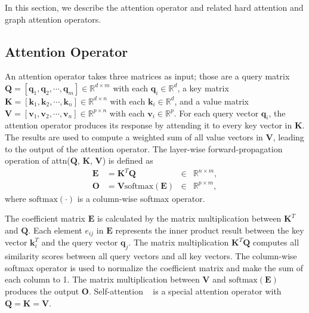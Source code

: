 \documentclass[sigconf]{acmart}
\begin{document}
In this section, we describe the attention operator and related hard
attention and graph attention operators.

\subsection{Attention Operator}\label{sec:att}

An attention operator takes three matrices as input; those are a query matrix
$\boldsymbol Q = [\mathbf{q}_{1}, \mathbf{q}_{2}, \cdots, \mathbf{q}_{m}] \in
\mathbb{R}^{d \times m}$ with each $\mathbf{q}_{i} \in \mathbb{R}^{d}$, a key
matrix $\boldsymbol K = [\mathbf{k}_{1}, \mathbf{k}_{2}, \cdots,
\mathbf{k}_{n}] \in \mathbb{R}^{d \times n}$ with each $\mathbf{k}_{i} \in
\mathbb{R}^{d}$, and a value matrix $\boldsymbol V = [\mathbf{v}_{1},
\mathbf{v}_{2}, \cdots, \mathbf{v}_{n}] \in \mathbb{R}^{p \times n}$ with each
$\mathbf{v}_{i} \in \mathbb{R}^{p}$. For each query vector $\boldsymbol q_i$,
the attention operator produces its response by attending it to every key vector
in $\boldsymbol K$. The results are used to compute a weighted sum of all value
vectors in $\boldsymbol V$, leading to the output of the attention operator.
The layer-wise forward-propagation operation of attn($\boldsymbol Q$, $\boldsymbol K$,
$\boldsymbol V$) is defined as
\begin{equation}\label{eq:att}
\begin{aligned}
\boldsymbol E &= \boldsymbol K^T \boldsymbol Q &\in& \mathbb{R}^{n \times m},\\
\boldsymbol O &= \boldsymbol V \mbox{softmax}(\boldsymbol E) &\in& \mathbb{R}^{p \times m},
\end{aligned}
\end{equation}
where $\mbox{softmax}(\cdot)$ is a column-wise softmax operator.

The coefficient matrix $\boldsymbol E$ is calculated by the matrix
multiplication between $\boldsymbol K^T$ and $\boldsymbol Q$. Each
element $e_{ij}$ in $\boldsymbol E$ represents the inner product
result between the key vector $\boldsymbol k^T_i$ and the query
vector $\boldsymbol q_j$. The matrix multiplication $\boldsymbol K^T
\boldsymbol Q$ computes all similarity scores between all query
vectors and all key vectors. The column-wise softmax operator is
used to normalize the coefficient matrix and make the sum of each
column to 1. The matrix multiplication between $\boldsymbol V$ and
$\mbox{softmax}(\boldsymbol E)$ produces the output $\boldsymbol O$.
Self-attention ~\cite{vaswani2017attention} is a special attention
operator with $\boldsymbol Q=\boldsymbol K=\boldsymbol V$.
\end{document}
